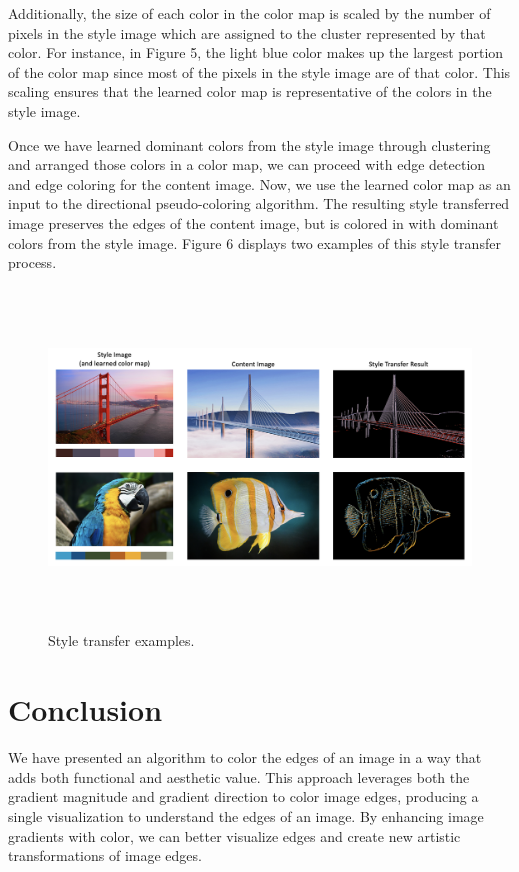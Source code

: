 \documentclass{article}
\begin{document}
Additionally, the size of each color in the color map is scaled by the number of pixels in the style image which are assigned to the cluster represented by that color. For instance, in Figure 5, the light blue color makes up the largest portion of the color map since most of the pixels in the style image are of that color. This scaling ensures that the learned color map is representative of the colors in the style image.

Once we have learned dominant colors from the style image through clustering and arranged those colors in a color map, we can proceed with edge detection and edge coloring for the content image. Now, we use the learned color map as an input to the directional pseudo-coloring algorithm. The resulting style transferred image preserves the edges of the content image, but is colored in with dominant colors from the style image. Figure 6 displays two examples of this style transfer process.

\begin{figure}[t]
\centering
\includegraphics[height=9cm]{images/style_transfer_examples.png}
\caption{Style transfer examples.}
\end{figure}

\section{Conclusion}

We have presented an algorithm to color the edges of an image in a way that adds both functional and aesthetic value. This approach leverages both the gradient magnitude and gradient direction to color image edges, producing a single visualization to understand the edges of an image. By enhancing image gradients with color, we can better visualize edges and create new artistic transformations of image edges.
\end{document}
